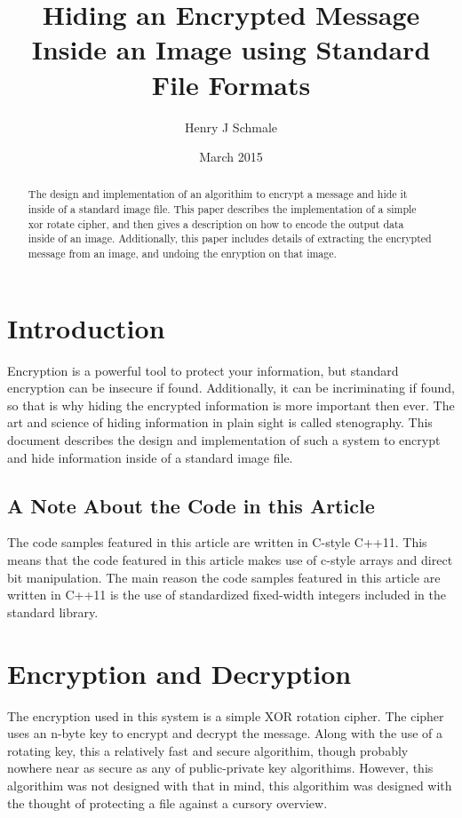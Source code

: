 \documentclass[12pt]{article}
\begin{document}
\title{Hiding an Encrypted Message Inside an Image using
      Standard File Formats}
\author{Henry J Schmale}
\date{March 2015}
\maketitle

\begin{abstract}
  The design and implementation of an algorithim to encrypt a message
  and hide it inside of a standard image file. This paper describes
  the implementation of a simple xor rotate cipher, and then gives
  a description on how to encode the output data inside of an image.
  Additionally, this paper includes details of extracting the
  encrypted message from an image, and undoing the enryption on that
  image.
\end{abstract}

\newpage
\tableofcontents                       %
\listoffigures                         %
\listoftables                          %
\newpage

\section{Introduction}
  Encryption is a powerful tool to protect your information, but standard
  encryption can be insecure if found. Additionally, it can be 
  incriminating if found, so that is why hiding the encrypted 
  information is more important then ever. The art and science of hiding
  information in plain sight is called stenography. This document 
  describes the design and implementation of such a system to encrypt
  and hide information inside of a standard image file.

  \subsection{A Note About the Code in this Article}
    The code samples featured in this article are written in C-style 
    C++11. This means that the code featured in this article makes use 
    of c-style arrays and direct bit manipulation. The main reason the 
    code samples featured in this article are written in C++11 is the 
    use of standardized fixed-width integers included in the standard 
    library.

\section{Encryption and Decryption}
  The encryption used in this system is a simple XOR rotation cipher.
  The cipher uses an n-byte key to encrypt and decrypt the message.
  Along with the use of a rotating key, this a relatively fast and
  secure algorithim, though probably nowhere near as secure as any of
  public-private key algorithims. However, this algorithim was not
  designed with that in mind, this algorithim was designed with the
  thought of protecting a file against a cursory overview.
  
\end{document}

